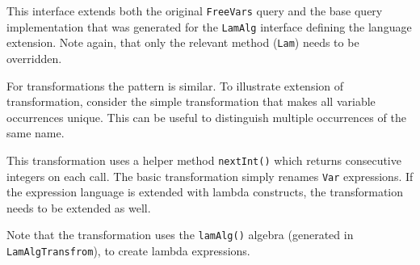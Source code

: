 
This interface extends both the original \lstinline{FreeVars} query and the base query implementation that was generated for the \lstinline{LamAlg} interface defining the language extension.
Note again, that only the relevant method (\lstinline{Lam}) needs to be overridden. 


For transformations the pattern is similar.
To illustrate extension of transformation, consider the simple transformation that makes all variable occurrences unique.
This can be useful to distinguish multiple occurrences of the same name.


This transformation uses a helper method \lstinline{nextInt()} which returns consecutive integers on each call.
The basic transformation simply renames \lstinline{Var} expressions.
If the expression language is extended with lambda constructs, the transformation needs to be extended as well.


Note that the transformation uses the \lstinline{lamAlg()} algebra (generated in \lstinline{LamAlgTransfrom}),
to create lambda expressions.



  


